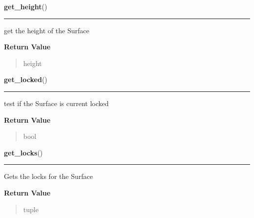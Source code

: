 \hspace{.8\funcindent}\begin{boxedminipage}{\funcwidth}

    \raggedright \textbf{get\_height}()

    \vspace{-1.5ex}

    \rule{\textwidth}{0.5\fboxrule}
\setlength{\parskip}{2ex}
    get the height of the Surface

\setlength{\parskip}{1ex}
      \textbf{Return Value}
    \vspace{-1ex}

      \begin{quote}
      height

      \end{quote}

    \end{boxedminipage}

    \label{pygame:Surface:get_locked}

    \vspace{0.5ex}

\hspace{.8\funcindent}\begin{boxedminipage}{\funcwidth}

    \raggedright \textbf{get\_locked}()

    \vspace{-1.5ex}

    \rule{\textwidth}{0.5\fboxrule}
\setlength{\parskip}{2ex}
    test if the Surface is current locked

\setlength{\parskip}{1ex}
      \textbf{Return Value}
    \vspace{-1ex}

      \begin{quote}
      bool

      \end{quote}

    \end{boxedminipage}

    \label{pygame:Surface:get_locks}

    \vspace{0.5ex}

\hspace{.8\funcindent}\begin{boxedminipage}{\funcwidth}

    \raggedright \textbf{get\_locks}()

    \vspace{-1.5ex}

    \rule{\textwidth}{0.5\fboxrule}
\setlength{\parskip}{2ex}
    Gets the locks for the Surface

\setlength{\parskip}{1ex}
      \textbf{Return Value}
    \vspace{-1ex}

      \begin{quote}
      tuple

      \end{quote}

    \end{boxedminipage}

